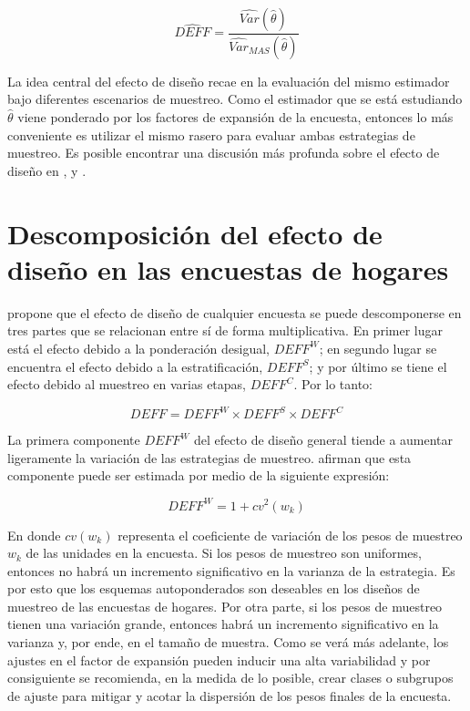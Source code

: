 \documentclass[
  12pt,
  spanish,
]{book}
\begin{document}
\[
\widehat{DEFF} = \frac{\widehat{Var}(\hat\theta)}{\widehat{Var}_{MAS}(\hat{\theta})}
\]

La idea central del efecto de diseño recae en la evaluación del mismo estimador bajo diferentes escenarios de muestreo. Como el estimador que se está estudiando \(\hat \theta\) viene ponderado por los factores de expansión de la encuesta, entonces lo más conveniente es utilizar el mismo rasero para evaluar ambas estrategias de muestreo. Es posible encontrar una discusión más profunda sobre el efecto de diseño en \citet[sección 4.]{Gambino_2009}, \citet[página 188]{Sarndal_Swensson_Wretman_2003} y \citet[página 101]{Gutierrez_Zhang_Montano_2016}.

\hypertarget{descomposiciuxf3n-del-efecto-de-diseuxf1o-en-las-encuestas-de-hogares}{%
\section{Descomposición del efecto de diseño en las encuestas de hogares}\label{descomposiciuxf3n-del-efecto-de-diseuxf1o-en-las-encuestas-de-hogares}}

\citet{Park_2003} propone que el efecto de diseño de cualquier encuesta se puede descomponerse en tres partes que se relacionan entre sí de forma multiplicativa. En primer lugar está el efecto debido a la ponderación desigual, \(DEFF^W\); en segundo lugar se encuentra el efecto debido a la estratificación, \(DEFF^S\); y por último se tiene el efecto debido al muestreo en varias etapas, \(DEFF^C\). Por lo tanto:

\[
DEFF = DEFF^W \times DEFF^S \times DEFF^C
\]

La primera componente \(DEFF^W\) del efecto de diseño general tiende a aumentar ligeramente la variación de las estrategias de muestreo. \citet{Valliant_Dever_Kreuter_2018} afirman que esta componente puede ser estimada por medio de la siguiente expresión:

\[
DEFF^W = 1 + cv^2(w_k)
\]

En donde \(cv(w_k)\) representa el coeficiente de variación de los pesos de muestreo \(w_k\) de las unidades en la encuesta. Si los pesos de muestreo son uniformes, entonces no habrá un incremento significativo en la varianza de la estrategia. Es por esto que los esquemas autoponderados son deseables en los diseños de muestreo de las encuestas de hogares. Por otra parte, si los pesos de muestreo tienen una variación grande, entonces habrá un incremento significativo en la varianza y, por ende, en el tamaño de muestra. Como se verá más adelante, los ajustes en el factor de expansión pueden inducir una alta variabilidad y por consiguiente se recomienda, en la medida de lo posible, crear clases o subgrupos de ajuste para mitigar y acotar la dispersión de los pesos finales de la encuesta.
\end{document}
